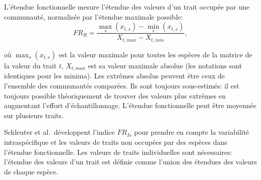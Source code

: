 \documentclass[
  11pt,
  french,
  a4paper,
  extrafontsizes,onecolumn,openright
  ]{memoir}
\begin{document}
L'étendue fonctionnelle \autocite{Mason2005} mesure l'étendue des valeurs d'un trait occupée par une communauté, normalisée par l'étendue maximale possible:
\begin{equation}
  \label{eq:FRR}
  \mathit{FR}_R = \dfrac{\max_s(x_{t,s}) - \min_s(x_{t,s})}{X_{t,max} - X_{t,min}},
\end{equation}

où \(\max_s(x_{t,s})\) est la valeur maximale pour toutes les espèces de la matrice de la valeur du trait \(t\), \(X_{t,max}\) est sa valeur maximale absolue (les notations sont identiques pour les minima).
Les extrêmes absolus peuvent être ceux de l'ensemble des communautés comparées.
Ils sont toujours sous-estimés: il est toujours possible théoriquement de trouver des valeurs plus extrêmes en augmentant l'effort d'échantillonnage.
L'étendue fonctionnelle peut être moyennée sur plusieurs traits.

Schleuter et al.~développent l'indice \(\mathit{FR}_{Is}\) pour prendre en compte la variabilité intraspécifique et les valeurs de traits non occupées par des espèces dans l'étendue fonctionnelle.
Les valeurs de traits individuelles sont nécessaires: l'étendue des valeurs d'un trait est définie comme l'union des étendues des valeurs de chaque espèce.



\scriptsize
\end{document}
